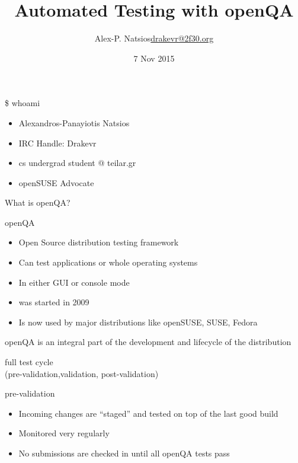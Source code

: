 \documentclass{beamer}
\title{Automated Testing with openQA}
\author{\texorpdfstring{Alex-P. Natsios\newline\url{drakevr@2f30.org}}{Author}}
\institute{Fosscomm 2015 - Athens}
\date{7 Nov 2015}
\begin{document}
    \begin{frame}
       \titlepage
    \end{frame}

    \begin{frame}{\$ whoami}
        \begin{itemize}
            \item Alexandros-Panayiotis Natsios
            \item IRC Handle: Drakevr
            \item cs undergrad student @ teilar.gr
            \item openSUSE Advocate
        \end{itemize}
    \end{frame}

    \begin{frame}
        \center\huge What is openQA?
    \end{frame}

    \begin{frame}{openQA}
        \begin{itemize}
            \item Open Source distribution testing framework
            \item Can test applications or whole operating systems
            \item In either GUI or console mode
            \item was started in 2009
            \item Is now used by major distributions like openSUSE, SUSE,  Fedora 
        \end{itemize}
    \end{frame}

    \begin{frame}
        \center\huge openQA is an integral part of the development and lifecycle of the distribution
    \end{frame}

    \begin{frame}
        \center\huge full test cycle \\
        (pre-validation,validation, post-validation)
    \end{frame}

    \begin{frame}{pre-validation}
        \begin{itemize}
            \item Incoming changes are ``staged'' and tested on top of the last good build
            \item Monitored very regularly
            \item No submissions are checked in until all openQA tests pass
        \end{itemize}
    \end{frame}
\end{document}
